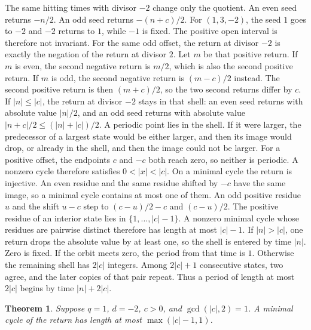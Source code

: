 \documentclass[11pt,letterpaper]{article}
\newtheorem{theorem}{Theorem}
\begin{document}
The same hitting times with divisor \(-2\) change only the quotient. An even seed returns \(-n/2\). An odd seed returns \(-(n+c)/2\). For \((1,3,-2)\), the seed \(1\) goes to \(-2\) and \(-2\) returns to \(1\), while \(-1\) is fixed. The positive open interval is therefore not invariant. For the same odd offset, the return at divisor \(-2\) is exactly the negation of the return at divisor \(2\). Let \(m\) be that positive return. If \(m\) is even, the second negative return is \(m/2\), which is also the second positive return. If \(m\) is odd, the second negative return is \((m-c)/2\) instead. The second positive return is then \((m+c)/2\), so the two second returns differ by \(c\). If \(\lvert n\rvert\le\lvert c\rvert\), the return at divisor \(-2\) stays in that shell: an even seed returns with absolute value \(\lvert n\rvert/2\), and an odd seed returns with absolute value \(\lvert n+c\rvert/2\le(\lvert n\rvert+\lvert c\rvert)/2\). A periodic point lies in the shell. If it were larger, the predecessor of a largest state would be either larger, and then its image would drop, or already in the shell, and then the image could not be larger. For a positive offset, the endpoints \(c\) and \(-c\) both reach zero, so neither is periodic. A nonzero cycle therefore satisfies \(0<\lvert x\rvert<\lvert c\rvert\). On a minimal cycle the return is injective. An even residue and the same residue shifted by \(-c\) have the same image, so a minimal cycle contains at most one of them. An odd positive residue \(u\) and the shift \(u-c\) step to \((c-u)/2-c\) and \((c-u)/2\). The positive residue of an interior state lies in \(\{1,\ldots,\lvert c\rvert-1\}\). A nonzero minimal cycle whose residues are pairwise distinct therefore has length at most \(\lvert c\rvert-1\). If \(\lvert n\rvert>\lvert c\rvert\), one return drops the absolute value by at least one, so the shell is entered by time \(\lvert n\rvert\). Zero is fixed. If the orbit meets zero, the period from that time is \(1\). Otherwise the remaining shell has \(2\lvert c\rvert\) integers. Among \(2\lvert c\rvert+1\) consecutive states, two agree, and the later copies of that pair repeat. Thus a period of length at most \(2\lvert c\rvert\) begins by time \(\lvert n\rvert+2\lvert c\rvert\).

\begin{theorem}
\label{thm:negtwosharp}
Suppose \(q=1\), \(d=-2\), \(c>0\), and \(\gcd(\lvert c\rvert,2)=1\). A minimal cycle of the return has length at most \(\max(\lvert c\rvert-1,1)\).
\end{theorem}
\end{document}
